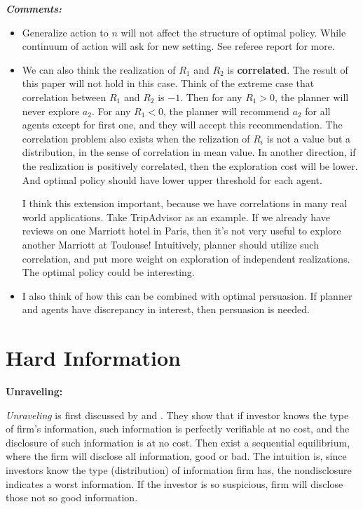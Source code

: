 \documentclass{book}
\theoremstyle{plain}
\theoremstyle{definition}
\begin{document}
\vspace{2mm}
\noindent
\textit{\textbf{Comments:}}
\begin{itemize}
	\item Generalize action to $n$ will not affect the structure of optimal policy. While continuum of action will ask for new setting. See referee report for more.

	\item We can also think the realization of $R_1$ and $R_2$ is \textbf{correlated}. 
	The result of this paper will not hold in this case.
	Think of the extreme case that correlation between $R_1$ and $R_2$ is $-1$.
	Then for any $R_1>0$, the planner will never explore $a_2$. For any $R_1<0$, the planner will recommend $a_2$ for all agents except for first one, and they will accept this recommendation.
	The correlation problem also exists when the relization of $R_i$ is not a value but a distribution, in the sense of correlation in mean value. In another direction, if the realization is positively correlated, then the exploration cost will be lower. And optimal policy should have lower upper threshold for each agent.
	\vspace{1mm}

	I think this extension important, because we have correlations in many real world applications.
	Take TripAdvisor as an example. If we already have reviews on one Marriott hotel in Paris, then it's not very useful to explore another Marriott at Toulouse! 
	Intuitively, planner should utilize such correlation, and put more weight on exploration of independent realizations.
	The optimal policy could be interesting.

	\item I also think of how this can be combined with optimal persuasion.
	If planner and agents have discrepancy in interest, 
	then persuasion is needed.
\end{itemize}



\section{Hard Information} %
\label{sec:hard_information}

\noindent
\textbf{Unraveling:}

\textit{Unraveling} is first discussed by \cite{Grossman:1981ih} and \cite{Milgrom:1981dv}. 
They show that if investor knows the type of firm's information, 
such information is perfectly verifiable at no cost, and the disclosure of such information is at no cost.
Then exist a sequential equilibrium, where the firm will disclose all information, good or bad.
The intuition is, since investors know the type (distribution) of information firm has, the nondisclosure indicates a worst information.
If the investor is so suspicious, firm will disclose those not so good information.
\end{document}
